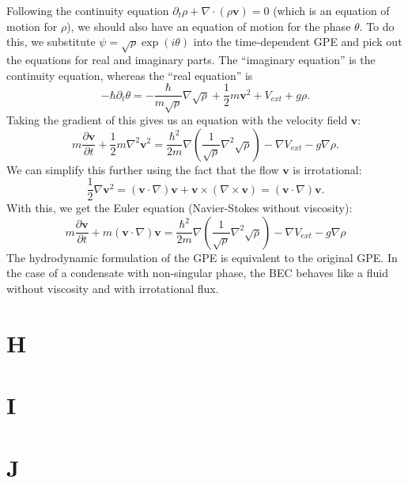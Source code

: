 \documentclass{book}
\theoremstyle{definition}
\newcommand{\p}{\partial}
\newcommand{\f}[2]{\frac{#1}{#2}}
\newcommand{\lp}{\left(}
\newcommand{\rp}{\right)}
\begin{document}
Following the continuity equation $\p_t \rho + \nabla \cdot (\rho \mathbf{v}) = 0$ (which is an equation of motion for $\rho$), we should also have an equation of motion for the phase $\theta$. To do this, we substitute $\psi = \sqrt{\rho}\exp(i\theta)$ into the time-dependent GPE and pick out the equations for real and imaginary parts. The ``imaginary equation'' is the continuity equation, whereas the ``real equation'' is 
\begin{equation*}
-\hbar \p_t \theta = -\f{\hbar }{m\sqrt{\rho}} \nabla \sqrt{\rho} + \f{1}{2} m\mathbf{v}^2 + V_{ext} + g\rho.
\end{equation*}
Taking the gradient of this gives us an equation with the velocity field $\mathbf{v}$:
\begin{equation*}
m\f{\p \mathbf{v}}{\p t} + \f{1}{2}m\nabla^2 \mathbf{v}^2 = \f{\hbar^2}{2m} \nabla \lp \f{1}{\sqrt{\rho}} \nabla^2 \sqrt{\rho} \rp - \nabla V_{ext} - g\nabla \rho.
\end{equation*}
We can simplify this further using the fact that the flow $\mathbf{v}$ is irrotational:
\begin{equation*}
\f{1}{2}\nabla \mathbf{v}^2 = (\mathbf{v}\cdot \nabla )\mathbf{v} + \mathbf{v} \times (\nabla \times \mathbf{v}) = (\mathbf{v}\cdot \nabla )\mathbf{v}.
\end{equation*}
With this, we get the Euler equation (Navier-Stokes without viscosity):
\begin{equation*}
\boxed{m\f{\p \mathbf{v}}{\p t} + m (\mathbf{v}\cdot \nabla) \mathbf{v} = \f{\hbar^2}{2m} \nabla \lp \f{1}{\sqrt{\rho}} \nabla^2 \sqrt{\rho} \rp - \nabla V_{ext} - g \nabla \rho} 
\end{equation*}
The hydrodynamic formulation of the GPE is equivalent to the original GPE. In the case of a condensate with non-singular phase, the BEC behaves like a fluid without viscosity and with irrotational flux. 
 

 
\chapter*{H}
\chapter*{I}
\chapter*{J}
\end{document}
